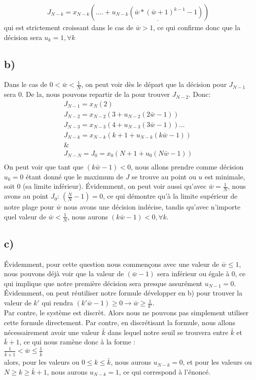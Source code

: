 \documentclass[oneside]{book}
\begin{document}
\begin{align*}
J_{N-k} = x_{N-k}(.... + \underline{u_{N-k}(\bar{w}*(\bar{w} + 1)^{k-1} -1)})
\end{align*}
qui est strictement croissant dans le cas de $\bar{w} > 1$, ce qui confirme donc que la décision sera $u_k = 1 ,\forall k$

\subsection*{b)}
Dans le cas de $0 < \bar{w} < \frac{1}{N}$, on peut voir dès le départ que la décision pour $J_{N-1}$ sera 0. De la, nous pouvons repartir de la pour trouver $J_{N-2}$. Donc:\\

\begin{align*}
J_{N-1} = x_N(2)\\
J_{N-2} = x_{N-2}(3 + u_{N-2}(2\bar{w} -1))\\
J_{N-3} = x_{N-3}(4 + u_{N-3}(3\bar{w} -1))...\\
J_{N-k} = x_{N-k}(k+1 + u_{N-k}(k\bar{w} - 1))\\
\&\\
J_{N-N} = J_0 = x_0(N+1 + u_0(N\bar{w} - 1))\\
\end{align*}
On peut voir que tant que $(k\bar{w} - 1) < 0$, nous allons prendre comme décision $u_k = 0$ étant donné que le maximum de $J$ se trouve au point ou $u$ est minimale, soit 0 (sa limite inférieur). Évidemment, on peut voir aussi qu'avec $\bar{w} = \frac{1}{N}$, nous avons au point $J_0$: $(\frac{N}{N} - 1) = 0$, ce qui démontre qu'à la limite supérieur de notre plage pour $\bar{w}$ nous avons une décision indécise, tandis qu'avec n'importe quel valeur de $\bar{w} < \frac{1}{N}$, nous aurons $(k\bar{w} - 1) < 0, \forall k$.\\

\subsection*{c)}
Évidemment, pour cette question nous commençons avec une valeur de $\bar{w} \leq 1$, nous pouvons déjà voir que la valeur de $(\bar{w} - 1)$ sera inférieur ou égale à 0, ce qui implique que notre première décision sera presque assurément $u_{N-1} = 0$. Évidemment, on peut réutiliser notre formule développer en b) pour trouver la valeur de $k'$ qui rendra $(k'\bar{w} - 1) \geq 0 \rightarrow \bar{w} \geq \frac{1}{k'}$.\\

Par contre, le système est discrèt. Alors nous ne pouvons pas simplement utiliser cette formule directement. Par contre, en discrétisant la formule, nous allons nécessairement avoir une valeur $\bar{k}$ dans lequel notre seuil se trouvera entre $\bar{k}$ et $\bar{k}+1$, ce qui nous ramène donc à la forme :\\

$\frac{1}{\bar{k} + 1} < \bar{w} \leq \frac{1}{\bar{k}}$\\

alors, pour les valeurs ou $0 \leq k \leq \bar{k}$, nous aurons $u_{N-k} = 0$, et pour les valeurs ou $N \geq k \geq \bar{k}+1$, nous aurons $u_{N-k} = 1$, ce qui correspond à l'énoncé. 
 
\end{document}
